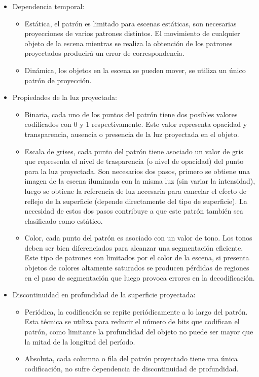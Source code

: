 \begin{itemize}
   \item Dependencia  temporal:
   \begin{itemize}
	\item Estática, el patrón es limitado para escenas estáticas, son necesarias proyecciones de varios patrones distintos. El movimiento de cualquier objeto de la escena mientras se realiza la obtención de los patrones proyectados producirá un error de correspondencia.
	\item Dinámica, los objetos en la escena se pueden mover, se utiliza un único patrón de proyección.
   \end{itemize}
   \item Propiedades de la luz proyectada:
   \begin{itemize}
	\item Binaria, cada uno de los puntos del patrón tiene dos posibles valores codificados con 0 y 1 respectivamente. Este valor representa opacidad y transparencia, ausencia o presencia de la luz proyectada en el objeto.
	\item Escala de grises, cada punto del patrón tiene asociado un valor de gris que representa el nivel de trasparencia (o nivel de opacidad) del punto para la luz proyectada. Son necesarios dos pasos, primero se obtiene una imagen de la escena iluminada con la misma luz (sin variar la intensidad), luego se obtiene la referencia de luz necesaria para cancelar el efecto de reflejo de la superficie (depende directamente del tipo de superficie). La necesidad de estos dos pasos contribuye a que este patrón también sea clasificado como estático.
	\item Color, cada punto del patrón es asociado con un valor de tono. Los tonos deben ser bien diferenciados para alcanzar una segmentación eficiente. Este tipo de patrones son limitados por el color de la escena, si presenta objetos de colores altamente saturados se producen pérdidas de regiones en el paso de segmentación que luego provoca errores en la decodificación.
   \end{itemize}
   \item Discontinuidad en profundidad de la superficie proyectada:
   \begin{itemize}
	\item Periódica, la codificación se repite periódicamente a lo largo del patrón. Esta  técnica se utiliza para reducir el número de bits que codifican el patrón, como limitante la profundidad del objeto no puede ser mayor que la mitad de la longitud del período.
	\item Absoluta, cada columna o fila del patrón proyectado tiene una única codificación, no sufre dependencia de discontinuidad de profundidad.
   \end{itemize}
\end{itemize}

